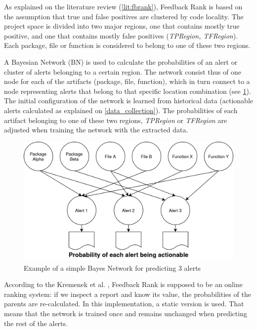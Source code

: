 As explained on the literature review (\cref{lit:fbrank}), Feedback Rank is based on the assumption that true and false positives are clustered by code locality. The project space is divided into two major regions, one that contains mostly true positive, and one that contains mostly false positives (\textit{TPRegion, TFRegion}). Each package, file or function is considered to belong to one of these two regions. 

A Bayesian Network (BN) is used to calculate the probabilities of an alert or cluster of alerts belonging to a certain region. The network consist thus of one node for each of the artifacts (package, file, function), which in turn connect to a node representing alerts that belong to that specific location combination (see \cref{simple_bn}).  
The initial configuration of the network is learned from historical data (actionable alerts calculated as explained on \cref{data_collection}). The probabilities of each artifact belonging to one of these two regions, \textit{TPRegion} or \textit{TFRegion} are adjusted when training the network with the extracted data.

\begin{figure}[H]
	\centering
	\includegraphics[scale=0.2]{./src/bayes_example.png}
	\caption{Example of a simple Bayes Network for predicting 3 alerts}
	\label{simple_bn}
\end{figure}

According to the Kremenek et al. \cite{correlation_exploitation}, Feedback Rank is supposed to be an online ranking system: if we inspect a report and know its value, the probabilities of the parents are re-calculated. In this implementation, a static version is used. That means that the network is trained once and remains unchanged when predicting the rest of the alerts.

